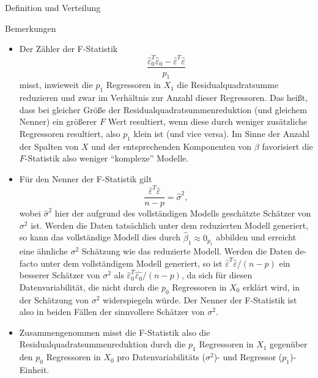 \documentclass[
  8pt,
  ignorenonframetext,
]{beamer}
\providecommand{\tightlist}{%
  \setlength{\itemsep}{0pt}\setlength{\parskip}{0pt}}
\begin{document}
\begin{frame}{Definition und Verteilung}
\protect\hypertarget{definition-und-verteilung-1}{}
\footnotesize

Bemerkungen

\begin{itemize}
\tightlist
\item
  \justifying Der Zähler der F-Statistik \begin{equation}
  \frac{\hat{\varepsilon}_0^T\hat{\varepsilon}_0 - \hat{\varepsilon}^T\hat{\varepsilon}}{p_1}
  \end{equation} misst, inwieweit die \(p_1\) Regressoren in \(X_1\) die
  Residualquadratsumme reduzieren und zwar im Verhältnis zur Anzahl
  dieser Regressoren. Das heißt, dass bei gleicher Größe der
  Residualquadratsummenreduktion (und gleichem Nenner) ein größerer
  \(F\) Wert resultiert, wenn diese durch weniger zusätzliche
  Regressoren resultiert, also \(p_1\) klein ist (und vice versa). Im
  Sinne der Anzahl der Spalten von \(X\) und der entsprechenden
  Komponenten von \(\beta\) favorisiert die \(F\)-Statistik also weniger
  ``komplexe'' Modelle.
\item
  Für den Nenner der F-Statistik gilt \begin{equation}
  \frac{\hat{\varepsilon}^T\hat{\varepsilon}}{n-p} = \hat{\sigma}^2,
  \end{equation} wobei \(\hat{\sigma}^2\) hier der aufgrund des
  vollständigen Modells geschätzte Schätzer von \(\sigma^2\) ist. Werden
  die Daten tatsächlich unter dem reduzierten Modell generiert, so kann
  das vollständige Modell dies durch \(\hat{\beta}_1 \approx 0_{p_1}\)
  abbilden und erreicht eine ähnliche \(\sigma^2\) Schätzung wie das
  reduzierte Modell. Werden die Daten de-facto unter dem vollständigem
  Modell generiert, so ist
  \(\hat{\varepsilon}^T\hat{\varepsilon}/(n-p)\) ein besserer Schätzer
  von \(\sigma^2\) als
  \(\hat{\varepsilon}^T_0\hat{\varepsilon_0}/(n-p)\), da sich für diesen
  Datenvariabilität, die nicht durch die \(p_0\) Regressoren in \(X_0\)
  erklärt wird, in der Schätzung von \(\sigma^2\) widerspiegeln würde.
  Der Nenner der F-Statistik ist also in beiden Fällen der sinnvollere
  Schätzer von \(\sigma^2\).
\item
  Zusammengenommen misst die F-Statistik also die
  Residualquadratsummenreduktion durch die \(p_1\) Regressoren in
  \(X_1\) gegenüber den \(p_0\) Regressoren in \(X_0\) pro
  Datenvariabilitäts (\(\sigma^2\))- und Regressor (\(p_1\))-Einheit.
\end{itemize}
\end{frame}
\end{document}
